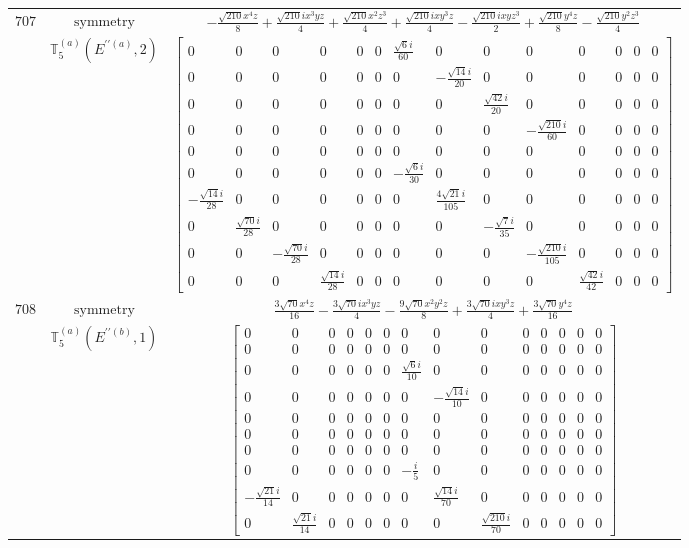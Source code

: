 \documentclass[fleqn,8pt,landscape]{jsarticle}
\begin{document}
\begin{longtable}{ccc}
$ 707 $ & $ \text{symmetry} $ & $ - \frac{\sqrt{210} x^{4} z}{8} + \frac{\sqrt{210} i x^{3} y z}{4} + \frac{\sqrt{210} x^{2} z^{3}}{4} + \frac{\sqrt{210} i x y^{3} z}{4} - \frac{\sqrt{210} i x y z^{3}}{2} + \frac{\sqrt{210} y^{4} z}{8} - \frac{\sqrt{210} y^{2} z^{3}}{4} $ \\
$  $ & $ \mathbb{T}_{5}^{(a)}(E^{\prime\prime(a)},2) $ & $ \begin{bmatrix} 0 & 0 & 0 & 0 & 0 & 0 & \frac{\sqrt{6} i}{60} & 0 & 0 & 0 & 0 & 0 & 0 & 0 \\ 0 & 0 & 0 & 0 & 0 & 0 & 0 & - \frac{\sqrt{14} i}{20} & 0 & 0 & 0 & 0 & 0 & 0 \\ 0 & 0 & 0 & 0 & 0 & 0 & 0 & 0 & \frac{\sqrt{42} i}{20} & 0 & 0 & 0 & 0 & 0 \\ 0 & 0 & 0 & 0 & 0 & 0 & 0 & 0 & 0 & - \frac{\sqrt{210} i}{60} & 0 & 0 & 0 & 0 \\ 0 & 0 & 0 & 0 & 0 & 0 & 0 & 0 & 0 & 0 & 0 & 0 & 0 & 0 \\ 0 & 0 & 0 & 0 & 0 & 0 & - \frac{\sqrt{6} i}{30} & 0 & 0 & 0 & 0 & 0 & 0 & 0 \\ - \frac{\sqrt{14} i}{28} & 0 & 0 & 0 & 0 & 0 & 0 & \frac{4 \sqrt{21} i}{105} & 0 & 0 & 0 & 0 & 0 & 0 \\ 0 & \frac{\sqrt{70} i}{28} & 0 & 0 & 0 & 0 & 0 & 0 & - \frac{\sqrt{7} i}{35} & 0 & 0 & 0 & 0 & 0 \\ 0 & 0 & - \frac{\sqrt{70} i}{28} & 0 & 0 & 0 & 0 & 0 & 0 & - \frac{\sqrt{210} i}{105} & 0 & 0 & 0 & 0 \\ 0 & 0 & 0 & \frac{\sqrt{14} i}{28} & 0 & 0 & 0 & 0 & 0 & 0 & \frac{\sqrt{42} i}{42} & 0 & 0 & 0 \end{bmatrix} $ \\ \hline
$ 708 $ & $ \text{symmetry} $ & $ \frac{3 \sqrt{70} x^{4} z}{16} - \frac{3 \sqrt{70} i x^{3} y z}{4} - \frac{9 \sqrt{70} x^{2} y^{2} z}{8} + \frac{3 \sqrt{70} i x y^{3} z}{4} + \frac{3 \sqrt{70} y^{4} z}{16} $ \\
$  $ & $ \mathbb{T}_{5}^{(a)}(E^{\prime\prime(b)},1) $ & $ \begin{bmatrix} 0 & 0 & 0 & 0 & 0 & 0 & 0 & 0 & 0 & 0 & 0 & 0 & 0 & 0 \\ 0 & 0 & 0 & 0 & 0 & 0 & 0 & 0 & 0 & 0 & 0 & 0 & 0 & 0 \\ 0 & 0 & 0 & 0 & 0 & 0 & \frac{\sqrt{6} i}{10} & 0 & 0 & 0 & 0 & 0 & 0 & 0 \\ 0 & 0 & 0 & 0 & 0 & 0 & 0 & - \frac{\sqrt{14} i}{10} & 0 & 0 & 0 & 0 & 0 & 0 \\ 0 & 0 & 0 & 0 & 0 & 0 & 0 & 0 & 0 & 0 & 0 & 0 & 0 & 0 \\ 0 & 0 & 0 & 0 & 0 & 0 & 0 & 0 & 0 & 0 & 0 & 0 & 0 & 0 \\ 0 & 0 & 0 & 0 & 0 & 0 & 0 & 0 & 0 & 0 & 0 & 0 & 0 & 0 \\ 0 & 0 & 0 & 0 & 0 & 0 & - \frac{i}{5} & 0 & 0 & 0 & 0 & 0 & 0 & 0 \\ - \frac{\sqrt{21} i}{14} & 0 & 0 & 0 & 0 & 0 & 0 & \frac{\sqrt{14} i}{70} & 0 & 0 & 0 & 0 & 0 & 0 \\ 0 & \frac{\sqrt{21} i}{14} & 0 & 0 & 0 & 0 & 0 & 0 & \frac{\sqrt{210} i}{70} & 0 & 0 & 0 & 0 & 0 \end{bmatrix} $ \\ \hline

\end{longtable}
\end{document}
